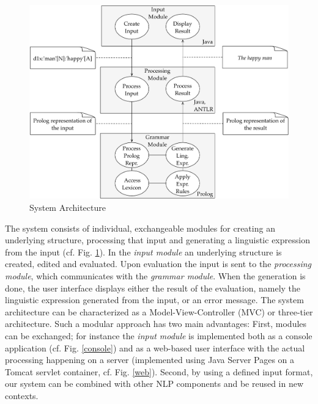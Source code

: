 \documentclass[a4paper, halfparskip, onecolumn, abstractoff, final]{scrartcl}
\begin{document}
\begin{figure}
\begin{center}
\includegraphics[width=15cm]{architecture.pdf}
\end{center}
\caption{System Architecture} \label{sysflow}
\end{figure}


The system consists of individual, exchangeable modules for creating an underlying structure, processing that input and generating a linguistic expression from the input (cf. Fig. \ref{sysflow}). In the \emph{input module} an underlying structure is created, edited and evaluated. Upon evaluation the input is sent to the \emph{processing module}, which communicates with the \emph{grammar module}. When the generation is done, the user interface displays either the result of the evaluation, namely the linguistic expression generated from the input, or an error message. The system architecture can be characterized as a Model-View-Controller (MVC) or three-tier architecture. Such a modular approach has two main advantages: First, modules can be exchanged; for instance the \emph{input module} is implemented both as a console application (cf. Fig. \ref{console}) and as a web-based user interface with the actual processing happening on a server (implemented using Java Server Pages on a Tomcat servlet container, cf. Fig. \ref{web}). Second, by using a defined input format, our system can be combined with other NLP components and be reused in new contexts.
\end{document}
